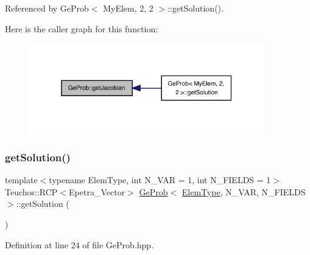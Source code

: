 Referenced by Ge\+Prob$<$ My\+Elem, 2, 2 $>$\+::get\+Solution().

Here is the caller graph for this function\+:
\nopagebreak
\begin{figure}[H]
\begin{center}
\leavevmode
\includegraphics[width=289pt]{classGeProb_a5c8159fd807c26eaec5c0a9fa72636f6_icgraph}
\end{center}
\end{figure}
\mbox{\label{classGeProb_ae29860923e40758aa1a7810556bb0f8e}} 
\subsubsection{\texorpdfstring{get\+Solution()}{getSolution()}}
{\footnotesize\ttfamily template$<$typename Elem\+Type, int N\+\_\+\+V\+AR = 1, int N\+\_\+\+F\+I\+E\+L\+DS = 1$>$ \\
Teuchos\+::\+R\+CP$<$Epetra\+\_\+\+Vector$>$ \hyperlink{classGeProb}{Ge\+Prob}$<$ \hyperlink{spectral_8h_aaa2c1a7b2d1b12c590d730fe6ac839fa}{Elem\+Type}, N\+\_\+\+V\+AR, N\+\_\+\+F\+I\+E\+L\+DS $>$\+::get\+Solution (\begin{DoxyParamCaption}{ }\end{DoxyParamCaption})\hspace{0.3cm}{\ttfamily [inline]}}



Definition at line 24 of file Ge\+Prob.\+hpp.

\mbox{\label{classGeProb_a1b1545b917023458df409bd97573bac5}} 
